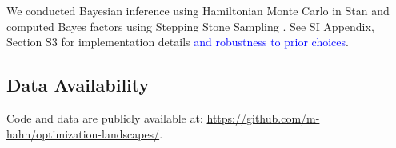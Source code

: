 \documentclass[9pt,twocolumn,twoside,lineno]{pnas-new}
\begin{document}
{We conducted Bayesian inference using Hamiltonian Monte Carlo in Stan \citep{homan2014the,carpenter2017stan} and computed Bayes factors using Stepping Stone Sampling \citep{xie2011improving}.
See SI Appendix, Section S3 for implementation details \textcolor{blue}{and robustness to prior choices}.


	\subsection*{Data Availability} Code and data are publicly available at:
\url{https://github.com/m-hahn/optimization-landscapes/}.



}

\showmatmethods{} %


\showacknow{} %

%

\end{document}
